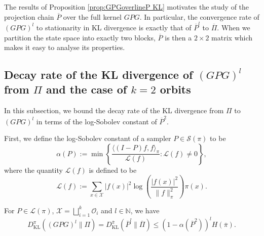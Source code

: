 \documentclass[EJP]{ejpecp} %
\begin{document}
The results of Proposition \ref{prop:GPGoverlineP KL} motivates the study of the projection chain $\overline{P}$ over the full kernel $GPG$. In particular, the convergence rate of $(GPG)^l$ to stationarity in KL divergence is exactly that of $\overline{P}^l$ to $\overline{\Pi}$. When we partition the state space into exactly two blocks, $\overline{P}$ is then a $2 \times 2$ matrix which makes it easy to analyse its properties.

\subsection{Decay rate of the KL divergence of $(GPG)^l$ from $\Pi$ and the case of $k=2$ orbits}

In this subsection, we bound the decay rate of the KL divergence from $\Pi$ to $(GPG)^l$ in terms of the log-Sobolev constant of $\overline{P}^2$.

First, we define the log-Sobolev constant of a sampler $P \in \mathcal{S}(\pi)$ to be
\begin{equation} \label{eq:alpha}
    \alpha(P) := \min \left\{ \frac{\langle (I - P)f, f \rangle_\pi}{\mathscr{L}(f)} : \mathscr{L}(f) \neq 0 \right\},
\end{equation}
where the quantity $\mathscr{L}(f)$ is defined to be 
$$\mathscr{L}(f) := \sum_{x\in \mathcal{X}} |f(x)|^2 \log\left(\frac{|f(x)|^2}{\|f\|_\pi^2}  \right)\pi(x).$$
\begin{proposition} \label{prop:logsobolevbound}
    For $P \in \mathcal{L}(\pi)$, $\mathcal{X} = \bigsqcup_{i=1}^k \mathcal{O}_i$ and $l \in \mathbb{N}$, we have
    $$D_{\mathrm{KL}}^\pi \left((GPG)^l \| \Pi \right) = D_{\mathrm{KL}}^{\overline\pi} \left( \overline{P}^l \| \overline{\Pi}\right) \leq \left(1-\alpha\left(\overline{P}^2\right)\right)^l H(\overline{\pi}).$$
\end{proposition}
\end{document}
